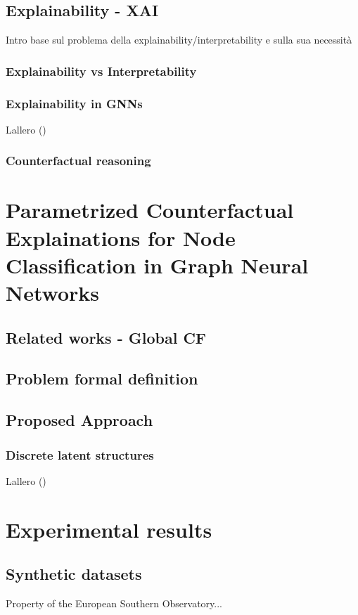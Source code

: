 \documentclass[binding=0.6cm,LaM]{sapthesis}
\newcommand{\mycite}[1]{(\cite{#1})}
\begin{document}
\section{Explainability - XAI}
\label{sec:xai}
Intro base sul problema della explainability/interpretability e sulla sua necessità
\subsection{Explainability vs Interpretability}
\subsection{Explainability in GNNs}
Lallero \mycite{ying2019gnnexplainer}
\subsection{Counterfactual reasoning}


\chapter{Parametrized Counterfactual Explainations for Node Classification in Graph Neural Networks}
\label{chap:3}
\section{Related works - Global CF}
\label{sec:gcf}
\section{Problem formal definition}
\label{sec:form-def}
\section{Proposed Approach}
\label{sec:cfpg}
\subsection{Discrete latent structures}
Lallero \mycite{niculae2023discrete}


\chapter{Experimental results}
\label{chap:4}

\section{Synthetic datasets}
\label{sec:syns}
Property of the European Southern Observatory...
\end{document}
